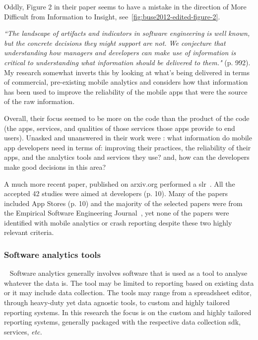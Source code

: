 Oddly, Figure 2 in their paper seems to have a mistake in the direction of More Difficult from Information to Insight, see~\ref{fig:buse2012-edited-figure-2}.

\emph{``The landscape of artifacts and indicators in software engineering is well known, but the concrete decisions they might support are not. We conjecture that understanding how managers and developers can make use of information is critical to understanding what information should be delivered to them."} (p. 992). 
My research somewhat inverts this by looking at what's being delivered in terms of commercial, pre-existing mobile analytics and considers how that information has been used to improve the reliability of the mobile apps that were the source of the raw information.

Overall, their focus seemed to be more on the code than the product of the code (the apps, services, and qualities of those services those apps provide to end users). Unasked and unanswered in their work were : what information do mobile app developers need in terms of: improving their practices, the reliability of their apps, and the analytics tools and services they use? and, how can the developers make good decisions in this area?

A much more recent paper, published on arxiv.org performed a \Gls{slr}~. All the accepted 42 studies were aimed at developers (p. 10). Many of the papers included App Stores (p. 10) and the majority of the selected papers were from the Empirical Software Engineering Journal~, yet none of the papers were identified with mobile analytics or crash reporting despite these two highly relevant criteria. 


\subsubsection{Software analytics tools}~\label{rw-software-analytics-tools-research}
Software analytics generally involves software that is used as a tool to analyse whatever the data is. The tool may be limited to reporting based on existing data or it may include data collection. The tools may range from a spreadsheet editor, through heavy-duty yet data agnostic tools, to custom and highly tailored reporting systems. In this research the focus is on the custom and highly tailored reporting systems, generally packaged with the respective data collection \Gls{sdk}, services, \emph{etc.}  

